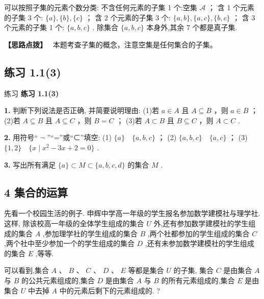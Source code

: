 \documentclass[a4paper,10pt,oneside,fontset=none]{ctexbook}
\newcommand{\fillin}[1][2cm]{\,\underline{\hspace{#1}}\,}
\newenvironment{exercise}[1][]{\begin{exBox}{练习}{#1}}{\end{exBox}}
\numberwithin{equation}{chapter}
\newenvironment{solution}{\begin{solutionBox}}{\end{solutionBox}}
\newenvironment{hint}{\begin{hintBox}\textbf{【思路点拨】}~}{\end{hintBox}}
\begin{document}
\begin{solution}
可以按照子集的元素个数分类:
不含任何元素的子集 1 个:空集 $\mathcal{A}$ ；
含 1 个元素的子集 3 个: $\{ a\} ,\{ b\} ,\{ c\}$ ；
含 2 个元素的子集 3 个: $\{ a, b\} ,\{ a, c\} ,\{ b, c\}$ ；
含 3 个元素的子集 1 个: $\{ a, b, c\}$ .
除集合 $\{ a, b, c\}$ 本身外,其余 7 个都是真子集.
\end{solution}

\begin{hint}
本题考查子集的概念，注意空集是任何集合的子集。
\end{hint}

\subsection*{练习 1.1(3)}

\begin{exercise}
\textbf{练习 1.1(3)}\par\vspace{0.5em}
\textbf{1.} 判断下列说法是否正确, 并简要说明理由: (1)若 $a \in  A$ 且 $A \subseteq  B$ ，则 $a \in  B$ ； (2)若 $A \subseteq  B$ 且 $A \subseteq  C$ ，则 $B = C$ ； (3)若 $A \subset  B$ 且 $B \subseteq  C$ ，则 $A \subset  C$ .
\par\vspace{0.8em}
\textbf{2.} 用符号“ $\neg$ ”“=”或“⊂”填空: (1) $\{ a\}$ \fillin[2cm] $\{ a, b, c\}$ ； (2) $\{ a, b, c\}$ \fillin[2cm] $\{ a, c\}$ ； (3) $\{ 1,2\}$ \fillin[2cm] $\{ x \mid  {x}^{2} - {3x} + 2 = 0\}$ .
\par\vspace{0.8em}
\textbf{3.} 写出所有满足 $\{ a\}  \subset  M \subset  \{ a, b, c, d\}$ 的集合 $M$ .
\end{exercise}

\subsection{4 集合的运算}

先看一个校园生活的例子. 申辉中学高一年级的学生报名参加数学建模社与理学社. 这样, 除该校高一年级的全体学生组成的集合 $U$ 外,还有参加数学建模社的学生组成的集合 $A$ ,参加理学社的学生组成的集合 $B$ ,两个社都参加的学生组成的集合 $C$ ,两个社中至少参加一个的学生组成的集合 $D$ ,还有未参加数学建模社的学生组成的集合 $E$ ,等等.

可以看到,集合 $A\text{ 、 }B\text{ 、 }C\text{ 、 }D\text{ 、 }E$ 等都是集合 $U$ 的子集, 集合 $C$ 是由集合 $A$ 与 $B$ 的公共元素组成的,集合 $D$ 是由集合 $A$ 与 $B$ 的所有元素组成的,集合 $E$ 是由集合 $U$ 中去掉 $A$ 中的元素后剩下的元素组成的. ?
\end{document}
